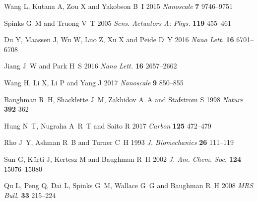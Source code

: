 \documentclass[12pt]{iopart}
\begin{document}
\begin{thebibliography}{10}
Wang L, Kutana A, Zou X and Yakobson B~I 2015 {\em Nanoscale\/} {\bf 7}
  9746--9751

Spinks G~M and Truong V~T 2005 {\em Sens. Actuators A: Phys.\/} {\bf 119}
  455--461

Du Y, Maassen J, Wu W, Luo Z, Xu X and Peide D~Y 2016 {\em Nano Lett.\/} {\bf
  16} 6701--6708

Jiang J~W and Park H~S 2016 {\em Nano Lett.\/} {\bf 16} 2657--2662

Wang H, Li X, Li P and Yang J 2017 {\em Nanoscale\/} {\bf 9} 850--855

Baughman R~H, Shacklette J~M, Zakhidov A~A and Stafstrom S 1998 {\em Nature\/}
  {\bf 392} 362

Hung N~T, Nugraha A~R~T and Saito R 2017 {\em Carbon\/} {\bf 125} 472--479

Rho J~Y, Ashman R~B and Turner C~H 1993 {\em J. Biomechanics\/} {\bf 26}
  111--119

Sun G, K{\"u}rti J, Kertesz M and Baughman R~H 2002 {\em J. Am. Chem. Soc.\/}
  {\bf 124} 15076--15080

Qu L, Peng Q, Dai L, Spinks G~M, Wallace G~G and Baughman R~H 2008 {\em MRS
  Bull.\/} {\bf 33} 215--224

\end{thebibliography}
\end{document}
